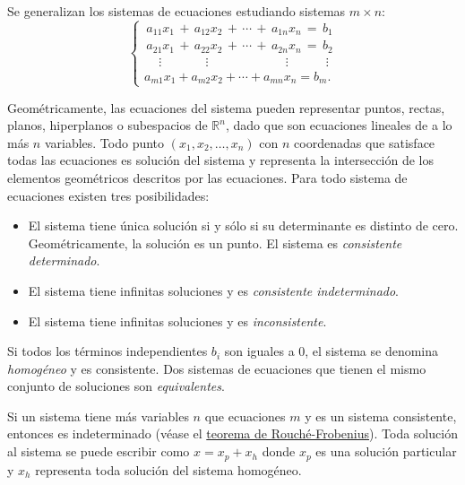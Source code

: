 \documentclass{fmbnotes}
\begin{document}
Se generalizan los sistemas de ecuaciones estudiando sistemas \(m \times n\):
\begin{equation}
\begin{cases}
\, a_{11}x_1 \, + \, a_{12}x_2 \,\! + \,\! \cdots \,\! + \, a_{1n}x_n \, = \, b_1 \\ 
\, a_{21}x_1 \, + \, a_{22}x_2 \,\! + \,\! \cdots \,\! + \, a_{2n}x_n \, = \, b_2 \\
\quad \, \vdots \qquad \quad \, \, \, \vdots \qquad \quad \, \qquad \quad \vdots \qquad \quad \vdots \\
a_{m1}x_1+a_{m2}x_2+\cdots+a_{mn}x_n=b_m.
\end{cases}
\label{eq:sistema_mxn}
\end{equation}

Geométricamente, las ecuaciones del sistema pueden representar puntos, rectas, planos, hiperplanos o subespacios de \(\mathbb{R}^{n}\), dado que son ecuaciones lineales de a lo más \(n\) variables. Todo punto \((x_1,x_2,\ldots,x_n)\) con \(n\) coordenadas que satisface todas las ecuaciones es solución del sistema y representa la intersección de los elementos geométricos descritos por las ecuaciones. Para todo sistema de ecuaciones existen tres posibilidades:
\begin{itemize}
\item El sistema tiene única solución si y sólo si su determinante es distinto de cero. Geométricamente, la solución es un punto. El sistema es \emph{consistente determinado}. 
\item El sistema tiene infinitas soluciones y es \emph{consistente indeterminado}. 
\item El sistema tiene infinitas soluciones y es \emph{inconsistente}.  
\end{itemize}

Si todos los términos independientes \(b_i\) son iguales a 0, el sistema se denomina \emph{homogéneo} y es consistente. Dos sistemas de ecuaciones que tienen el mismo conjunto de soluciones son \emph{equivalentes}.

Si un sistema tiene más variables \(n\) que ecuaciones \(m\) y es un sistema consistente, entonces es indeterminado (véase el \hyperlink{thm:teorema_rouche-frobenius}{teorema de Rouché-Frobenius}). Toda solución al sistema se puede escribir como \( x = x_p + x_h \) donde \( x_p \) es una solución particular y \(x_h\) representa toda solución del sistema homogéneo.

\end{document}
